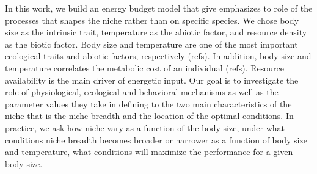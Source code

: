 In this work, we build an energy budget model that give emphasizes to role of the processes that shapes the niche rather than on specific species.
We chose body size as the intrinsic trait, temperature as the abiotic factor, and resource density as the biotic factor.
Body size and temperature are one of the most important ecological traits and abiotic factors, respectively (refs).
In addition, body size and temperature correlates the metabolic cost of an individual (refs).
Resource availability is the main driver of energetic input. 
Our goal is to investigate the role of physiological, ecological and behavioral mechanisms as well as the parameter values they take in defining to the two main characteristics of the niche that is the niche breadth and the location of the optimal conditions.
In practice, we ask how niche vary as a function of the body size, under what conditions niche breadth becomes broader or narrower as a function of body size and temperature, what conditions will maximize the performance for a given body size.
